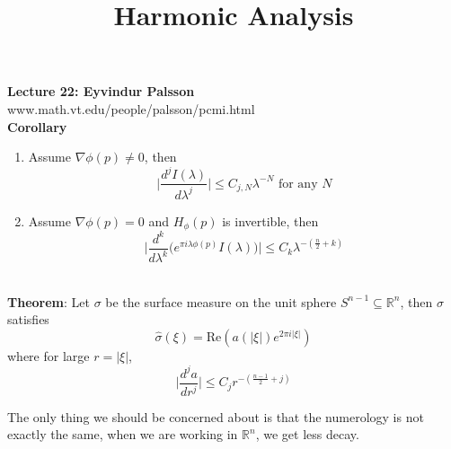 \documentclass[12pt]{article}
\title{Harmonic Analysis}
\begin{document}
\noindent \textbf{Lecture 22: Eyvindur Palsson} \\
\noindent www.math.vt.edu/people/palsson/pcmi.html \\

\noindent \textbf{Corollary} \\
\begin{enumerate}
\item Assume $\nabla \phi(p) \not =0$, then 
$$\vert \frac{d^jI(\lambda)}{d\lambda^j}\vert \leq C_{j,N}\lambda^{-N} \text{ for any } N$$
\item Assume $\nabla \phi(p) =0$ and $H_{\phi}(p)$ is invertible, then
$$ \vert \frac{d^k}{d\lambda^k} \Big(e^{\pi i \lambda \phi(p)} I(\lambda)\Big) \vert \leq C_k \lambda^{-(\frac{n}{2}+k)}$$
 \\
\end{enumerate}
\noindent \textbf{Theorem}: Let $\sigma$ be the surface measure on the unit sphere $S^{n-1} \subseteq \mathbb{R}^n$, then $\sigma$ satisfies
$$\hat{\sigma}(\xi)= \text{Re}(a(\vert \xi \vert) e^{2\pi i \vert \xi \vert})$$
where for large $r = \vert \xi \vert$,
$$\vert \frac{d^ja}{dr^j}\vert \leq C_j r^{-(\frac{n-1}{2}+j)}$$

The only thing we should be concerned about is that the numerology is not exactly the same, when we are working in $\mathbb{R}^n$, we get less decay.  \\
\end{document}
